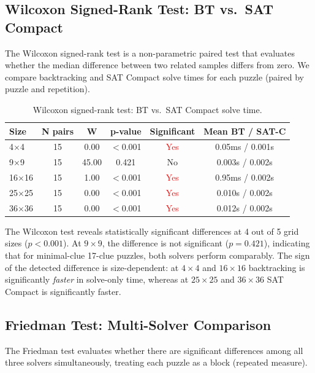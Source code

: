 \documentclass[12pt]{article}
\begin{document}
\subsection{Wilcoxon Signed-Rank Test: BT vs.\ SAT Compact}

The Wilcoxon signed-rank test is a non-parametric paired test that evaluates whether the median difference between two related samples differs from zero. We compare backtracking and SAT Compact solve times for each puzzle (paired by puzzle and repetition).

\begin{table}[htbp]
\centering
\caption{Wilcoxon signed-rank test: BT vs.\ SAT Compact solve time.}
\label{tab:wilcoxon}
\begin{tabular}{lccccc}
\toprule
\textbf{Size} & \textbf{N pairs} & \textbf{W} & \textbf{p-value} & \textbf{Significant} & \textbf{Mean BT / SAT-C} \\
\midrule
4$\times$4    & 15 & 0.00  & $<$0.001 & \textcolor{red}{Yes} & 0.05ms / 0.001s \\
9$\times$9    & 15 & 45.00 & 0.421   & No & 0.003s / 0.002s \\
16$\times$16  & 15 & 1.00  & $<$0.001 & \textcolor{red}{Yes} & 0.95ms / 0.002s \\
25$\times$25  & 15 & 0.00  & $<$0.001 & \textcolor{red}{Yes} & 0.010s / 0.002s \\
36$\times$36  & 15 & 0.00  & $<$0.001 & \textcolor{red}{Yes} & 0.012s / 0.002s \\
\bottomrule
\end{tabular}
\end{table}

The Wilcoxon test reveals statistically significant differences at 4 out of 5 grid sizes ($p < 0.001$). At $9\times9$, the difference is not significant ($p = 0.421$), indicating that for minimal-clue 17-clue puzzles, both solvers perform comparably. The sign of the detected difference is size-dependent: at $4\times4$ and $16\times16$ backtracking is significantly \emph{faster} in solve-only time, whereas at $25\times25$ and $36\times36$ SAT Compact is significantly faster.


\subsection{Friedman Test: Multi-Solver Comparison}

The Friedman test evaluates whether there are significant differences among all three solvers simultaneously, treating each puzzle as a block (repeated measure).
\end{document}
